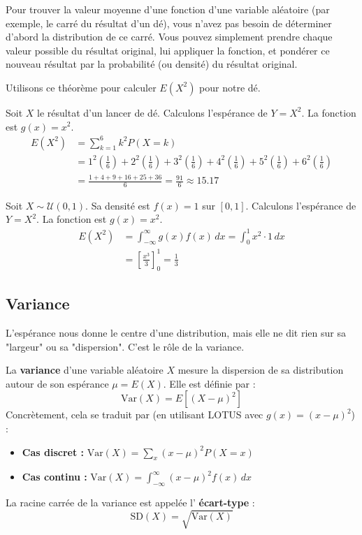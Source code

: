 \begin{intuitionbox}
Pour trouver la valeur moyenne d'une fonction d'une variable aléatoire (par exemple, le carré du résultat d'un dé), vous n'avez pas besoin de déterminer d'abord la distribution de ce carré. Vous pouvez simplement prendre chaque valeur possible du résultat original, lui appliquer la fonction, et pondérer ce nouveau résultat par la probabilité (ou densité) du résultat original.
\end{intuitionbox}

Utilisons ce théorème pour calculer $E(X^2)$ pour notre dé.

\begin{examplebox}
Soit $X$ le résultat d'un lancer de dé. Calculons l'espérance de $Y=X^2$. La fonction est $g(x)=x^2$.
\begin{align*}
E(X^2) &= \sum_{k=1}^6 k^2 P(X=k) \\
&= 1^2\left(\frac{1}{6}\right) + 2^2\left(\frac{1}{6}\right) + 3^2\left(\frac{1}{6}\right) + 4^2\left(\frac{1}{6}\right) + 5^2\left(\frac{1}{6}\right) + 6^2\left(\frac{1}{6}\right) \\
&= \frac{1+4+9+16+25+36}{6} = \frac{91}{6} \approx 15.17
\end{align*}
\end{examplebox}

\begin{examplebox}
Soit $X \sim \mathcal{U}(0, 1)$. Sa densité est $f(x)=1$ sur $[0, 1]$. Calculons l'espérance de $Y=X^2$. La fonction est $g(x)=x^2$.
\begin{align*}
E(X^2) &= \int_{-\infty}^{\infty} g(x) f(x) \, dx = \int_{0}^{1} x^2 \cdot 1 \, dx \\
&= \left[ \frac{x^3}{3} \right]_0^1 = \frac{1}{3}
\end{align*}
\end{examplebox}

\subsection{Variance}

L'espérance nous donne le centre d'une distribution, mais elle ne dit rien sur sa "largeur" ou sa "dispersion". C'est le rôle de la variance.

\begin{definitionbox}
La \textbf{variance} d'une variable aléatoire $X$ mesure la dispersion de sa distribution autour de son espérance $\mu = E(X)$. Elle est définie par :
$$ \text{Var}(X) = E\left[ (X - \mu)^2 \right] $$
Concrètement, cela se traduit par (en utilisant LOTUS avec $g(x)=(x-\mu)^2$) :
\begin{itemize}
    \item \textbf{Cas discret :} $ \text{Var}(X) = \sum_x (x - \mu)^2 P(X=x) $
    \item \textbf{Cas continu :} $ \text{Var}(X) = \int_{-\infty}^{\infty} (x - \mu)^2 f(x) \, dx $
\end{itemize}
La racine carrée de la variance est appelée l' \textbf{écart-type} :
$$ \text{SD}(X) = \sqrt{\text{Var}(X)} $$
\end{definitionbox}

